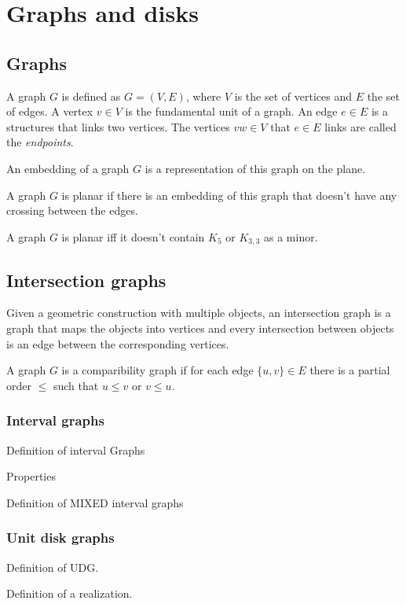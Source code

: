\section{Graphs and disks}
\label{sec:graphs}


\subsection{Graphs}

A graph $G$ is defined as $G = (V,E)$, where $V$ is the set of vertices and $E$ the set of edges. A vertex $v \in V$ is the fundamental unit of a graph. An edge $e \in E$ is a structures that links two vertices. The vertices $vw \in V$ that $e \in E$ links are called the \textit{endpoints}.

\begin{defn}
  An embedding of a graph $G$ is a representation of this graph on the plane.
\end{defn}

A graph $G$ is planar if there is an embedding of this graph that doesn't have any crossing between the edges.

\begin{theorem}[Kuratowski]
  A graph $G$ is planar iff it doesn't contain $K_5$ or $K_{3,3}$ as a minor.
\end{theorem}


\subsection{Intersection graphs}


Given a geometric construction with multiple objects, an intersection graph is a graph that maps the objects into vertices and every intersection between objects is an edge between the corresponding vertices.

\begin{defn}
  A graph $G$ is a comparibility graph if for each edge $\{u,v\} \in E$ there is a partial order $\leq$ such that $u \leq v$ or $v \leq u$.
\end{defn}

\subsubsection{Interval graphs}

Definition of interval Graphs

Properties

Definition of MIXED interval graphs
\subsubsection{Unit disk graphs}


Definition of UDG.

Definition of a realization.
